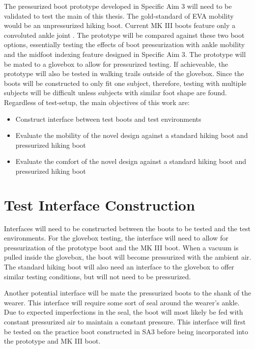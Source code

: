 \documentclass[defaultstyle,11pt]{comps}
\begin{document}
The pressurized boot prototype developed in Specific Aim 3 will need to be validated to test the main of this thesis.
The gold-standard of EVA mobility would be an unpressurized hiking boot.
Current MK III boots feature only a convoluted ankle joint \citep{Ross2002}.
The prototype will be compared against these two boot options, essentially testing the effects of boot pressurization with ankle mobility and the midfoot indexing feature designed in Specific Aim 3.
The prototype will be mated to a glovebox to allow for pressurized testing.
If achieveable, the prototype will also be tested in walking trails outside of the glovebox.
Since the boots will be constructed to only fit one subject, therefore, testing with multiple subjects will be difficult unless subjects with similar foot shape are found.
Regardless of test-setup, the main objectives of this work are:

\begin{itemize}
\item
  Construct interface between test boots and test environments
\item
  Evaluate the mobility of the novel design against a standard hiking boot and pressurized hiking boot
\item
  Evaluate the comfort of the novel design against a standard hiking boot and pressurized hiking boot
\end{itemize}

\hypertarget{test-interface-construction}{%
\section{Test Interface Construction}\label{test-interface-construction}}

Interfaces will need to be constructed between the boots to be tested and the test environments.
For the glovebox testing, the interface will need to allow for pressurization of the prototype boot and the MK III boot.
When a vacuum is pulled inside the glovebox, the boot will become pressurized with the ambient air.
The standard hiking boot will also need an interface to the glovebox to offer similar testing conditions, but will not need to be pressurized.

Another potential interface will be mate the pressurized boots to the shank of the wearer.
This interface will require some sort of seal around the wearer's ankle.
Due to expected imperfections in the seal, the boot will most likely be fed with constant pressurized air to maintain a constant pressure.
This interface will first be tested on the practice boot constructed in SA3 before being incorporated into the prototype and MK III boot.
\end{document}
